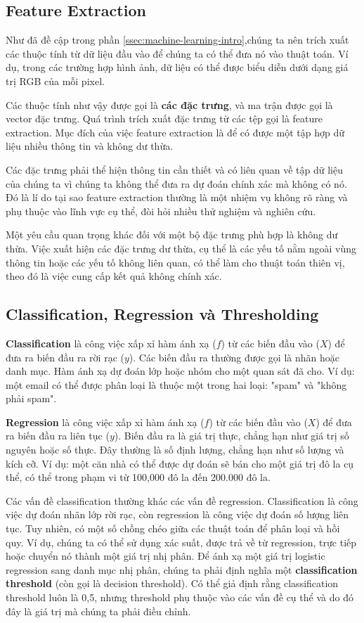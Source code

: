\subsection{Feature Extraction}

Như đã đề cập trong phần \ref{ssec:machine-learning-intro},chúng ta nên trích xuất các thuộc tính từ dữ liệu đầu vào để chúng ta có thể đưa nó vào thuật toán. Ví dụ, trong các trường hợp hình ảnh, dữ liệu có thể được biểu diễn dưới dạng giá trị RGB của mỗi pixel.

Các thuộc tính như vậy được gọi là \textbf{các đặc trưng}, và ma trận được gọi là vector đặc trưng. Quá trình trích xuất đặc trưng từ các tệp gọi là feature extraction. Mục đích của việc feature extraction là để có được một tập hợp dữ liệu nhiều thông tin và không dư thừa.

Các đặc trưng phải thể hiện thông tin cần thiết và có liên quan về tập dữ liệu của chúng ta vì chúng ta không thể đưa ra dự đoán chính xác mà không có nó.
Đó là lí do tại sao feature extraction thường là một nhiệm vụ không rõ ràng và phụ thuộc vào lĩnh vực cụ thể, đòi hỏi nhiều thử nghiệm và nghiên cứu.

Một yêu cầu quan trọng khác đối với một bộ đặc trưng phù hợp là không dư thừa.
Việc xuất hiện các đặc trưng dư thừa, cụ thể là các yếu tố nằm ngoài vùng thông tin hoặc các yếu tố không liên quan, có thể làm cho thuật toán thiên vị, theo đó là việc cung cấp kết quả không chính xác.

\subsection{Classification, Regression và Thresholding}

\textbf{Classification} là công việc xấp xỉ hàm ánh xạ ($f$) từ các biến đầu vào ($X$) để đưa ra biến đầu ra rời rạc ($y$). 
Các biến đầu ra thường được gọi là nhãn hoặc danh mục. 
Hàm ánh xạ dự đoán lớp hoặc nhóm cho một quan sát đã cho.
Ví dụ: một email có thể được phân loại là thuộc một trong hai loại: "spam" và "không phải spam".

\textbf{Regression} là công việc xấp xỉ hàm ánh xạ ($f$) từ các biến đầu vào ($X$) để đưa ra biến đầu ra liên tục ($y$). 
Biến đầu ra là giá trị thực, chẳng hạn như giá trị số nguyên hoặc số thực.
Đây thường là số định lượng, chẳng hạn như số lượng và kích cỡ.
Ví dụ: một căn nhà có thể được dự đoán sẽ bán cho một giá trị đô la cụ thể, có thể trong phạm vi từ 100,000 đô la đến 200.000 đô la.

Các vấn đề classification thường khác các vấn đề regression.
Classification là công việc dự đoán nhãn lớp rời rạc, còn regression là công việc dự đoán số lượng liên tục. 
Tuy nhiên, có một số chồng chéo giữa các thuật toán để phân loại và hồi quy.
Ví dụ, chúng ta có thể sử dụng xác suất, được trả về từ regression, trực tiếp hoặc chuyển nó thành một giá trị nhị phân. 
Để ánh xạ một giá trị logistic regression sang danh mục nhị phân, chúng ta phải định nghĩa một \textbf{classification threshold} (còn gọi là decision threshold).
Có thể giả định rằng classification threshold luôn là 0,5, nhưng threshold phụ thuộc vào các vấn đề cụ thể và do đó đây là giá trị mà chúng ta phải điều chỉnh.

